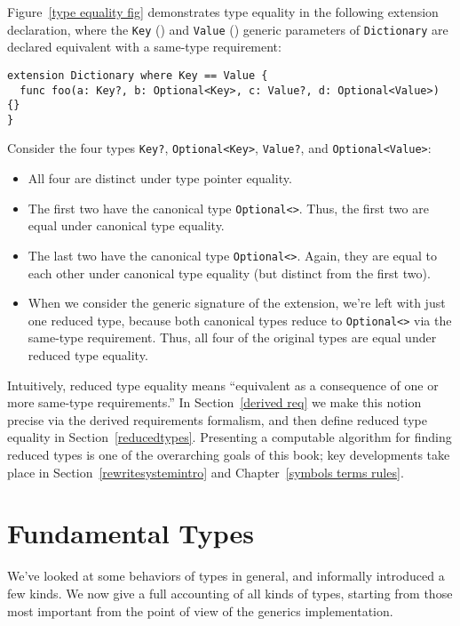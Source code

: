 \documentclass[../generics]{subfiles}
\begin{document}
Figure~\ref{type equality fig} demonstrates type equality in the following extension declaration, where the \texttt{Key} () and \texttt{Value} () generic parameters of \texttt{Dictionary} are declared equivalent with a same-type requirement:
\begin{Verbatim}
extension Dictionary where Key == Value {
  func foo(a: Key?, b: Optional<Key>, c: Value?, d: Optional<Value>) {}
}
\end{Verbatim}
Consider the four types \texttt{Key?}, \texttt{Optional<Key>}, \texttt{Value?}, and \texttt{Optional<Value>}:
\begin{itemize}
\item All four are distinct under type pointer equality.
\item The first two have the canonical type \texttt{Optional<>}. Thus, the first two are equal under canonical type equality.
\item The last two have the canonical type \texttt{Optional<>}. Again, they are equal to each other under canonical type equality (but distinct from the first two).
\item When we consider the generic signature of the extension, we're left with just one reduced type, because both canonical types reduce to \texttt{Optional<>} via the same-type requirement. Thus, all four of the original types are equal under reduced type equality.
\end{itemize}

Intuitively, reduced type equality means ``equivalent as a consequence of one or more same-type requirements.'' In Section~\ref{derived req} we make this notion precise via the derived requirements formalism, and then define reduced type equality in Section~\ref{reducedtypes}. Presenting a computable algorithm for finding reduced types is one of the overarching goals of this book; key developments take place in Section~\ref{rewritesystemintro} and Chapter~\ref{symbols terms rules}.

\section{Fundamental Types}\label{fundamental types}

We've looked at some behaviors of types in general, and informally introduced a few kinds. We now give a full accounting of all kinds of types, starting from those most important from the point of view of the generics implementation.
\end{document}
